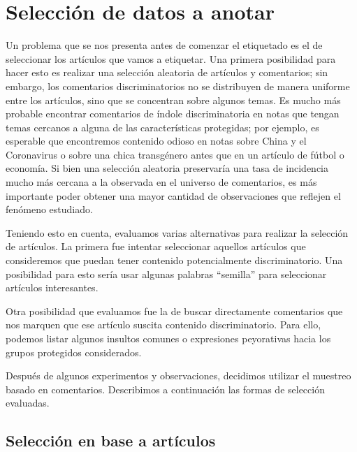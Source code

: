 \section{Selección de datos a anotar}


Un problema que se nos presenta antes de comenzar el etiquetado es el de seleccionar los artículos que vamos a etiquetar. Una primera posibilidad para hacer esto es realizar una selección aleatoria de artículos y comentarios; sin embargo, los comentarios discriminatorios no se distribuyen de manera uniforme entre los artículos, sino que se concentran sobre algunos temas. Es mucho más probable encontrar comentarios de índole discriminatoria en notas que tengan temas cercanos a alguna de las características protegidas; por ejemplo, es esperable que encontremos contenido odioso en notas sobre China y el Coronavirus o sobre una chica transgénero antes que en un artículo de fútbol o economía. Si bien una selección aleatoria preservaría una tasa de incidencia mucho más cercana a la observada en el universo de comentarios, es más importante poder obtener una mayor cantidad de observaciones que reflejen el fenómeno estudiado.

Teniendo esto en cuenta, evaluamos varias alternativas para realizar la selección de artículos. La primera fue intentar seleccionar aquellos artículos que consideremos que puedan tener contenido potencialmente discriminatorio. Una posibilidad para esto sería usar algunas palabras ``semilla'' para seleccionar artículos interesantes.

Otra posibilidad que evaluamos fue la de buscar directamente comentarios que nos marquen que ese artículo suscita contenido discriminatorio. Para ello, podemos listar algunos insultos comunes o expresiones peyorativas hacia los grupos protegidos considerados.

Después de algunos experimentos y observaciones, decidimos utilizar el muestreo basado en comentarios. Describimos a continuación las formas de selección evaluadas.



\subsection{Selección en base a artículos}

